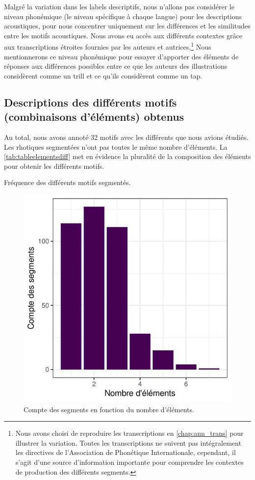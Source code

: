 Malgré la variation dans les labels descriptifs, nous n'allons pas considérer le niveau phonémique (le niveau spécifique à chaque langue) pour les descriptions acoustiques, pour nous concentrer uniquement sur les différences et les similitudes entre les motifs acoustiques. Nous avons eu accès aux différents contextes grâce aux transcriptions étroites fournies par les auteurs et autrices.\footnote{Nous avons choisi de reproduire les transcriptions en \autoref{chap:ann_trans} pour illustrer la variation. Toutes les transcriptions ne suivent pas intégralement les directives de l'Association de Phonétique Internationale, cependant, il s'agit d'une source d'information importante pour comprendre les contextes de production des différents segments.}
Nous mentionnerons ce niveau phonémique pour essayer d'apporter des éléments de réponses aux différences possibles entre ce que les auteurs des illustrations considèrent comme un trill et ce qu'ils considèrent comme un tap.



\subsection{Descriptions des différents motifs (combinaisons d'éléments) obtenus}

Au total, nous avons annoté 32 motifs avec les différents  que nous avions étudiés.
Les rhotiques segmentées n'ont pas toutes le même nombre d'éléments. La \autoref{tab:tableelementsdiff} met en évidence la pluralité de la composition des éléments pour obtenir les différents motifs. 

\begin{table}
	\centering
	
	\caption[Fréquence des différents motifs acoustiques segmentés]{Fréquence des différents motifs segmentés.}
	\label{tab:tableelementsdiff}
\end{table}

\begin{figure}
	\centering
	\includegraphics[width=0.45\linewidth]{substance/images/nb_elements}
	\caption[Compte des segments en fonction du nombre d'éléments]{Compte des segments en fonction du nombre d'éléments.}
	\label{fig:nbelements}
\end{figure}


